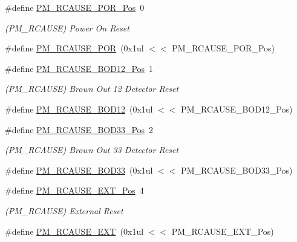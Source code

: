 \begin{DoxyCompactItemize}
\#define \mbox{\hyperlink{group___s_a_m_d21___p_m_ga34467ab2075605b8494c6540c5b5761a}{P\+M\+\_\+\+R\+C\+A\+U\+S\+E\+\_\+\+P\+O\+R\+\_\+\+Pos}}~0
\begin{DoxyCompactList}\small\item\em (P\+M\+\_\+\+R\+C\+A\+U\+SE) Power On Reset \end{DoxyCompactList}\item 
\#define \mbox{\hyperlink{group___s_a_m_d21___p_m_ga302ec011a5cc9a2bdfc793fe09ed5d17}{P\+M\+\_\+\+R\+C\+A\+U\+S\+E\+\_\+\+P\+OR}}~(0x1ul $<$$<$ P\+M\+\_\+\+R\+C\+A\+U\+S\+E\+\_\+\+P\+O\+R\+\_\+\+Pos)
\item 
\#define \mbox{\hyperlink{group___s_a_m_d21___p_m_ga22055fee692ccb23fee86eaa41bfc03a}{P\+M\+\_\+\+R\+C\+A\+U\+S\+E\+\_\+\+B\+O\+D12\+\_\+\+Pos}}~1
\begin{DoxyCompactList}\small\item\em (P\+M\+\_\+\+R\+C\+A\+U\+SE) Brown Out 12 Detector Reset \end{DoxyCompactList}\item 
\#define \mbox{\hyperlink{group___s_a_m_d21___p_m_ga80b791ec6e4eea8457acefdb2388bcd6}{P\+M\+\_\+\+R\+C\+A\+U\+S\+E\+\_\+\+B\+O\+D12}}~(0x1ul $<$$<$ P\+M\+\_\+\+R\+C\+A\+U\+S\+E\+\_\+\+B\+O\+D12\+\_\+\+Pos)
\item 
\#define \mbox{\hyperlink{group___s_a_m_d21___p_m_ga5e12f288c71a8c4f9a9308c6822f96a8}{P\+M\+\_\+\+R\+C\+A\+U\+S\+E\+\_\+\+B\+O\+D33\+\_\+\+Pos}}~2
\begin{DoxyCompactList}\small\item\em (P\+M\+\_\+\+R\+C\+A\+U\+SE) Brown Out 33 Detector Reset \end{DoxyCompactList}\item 
\#define \mbox{\hyperlink{group___s_a_m_d21___p_m_ga17b0eac2078f496f1cf9bf4de3045319}{P\+M\+\_\+\+R\+C\+A\+U\+S\+E\+\_\+\+B\+O\+D33}}~(0x1ul $<$$<$ P\+M\+\_\+\+R\+C\+A\+U\+S\+E\+\_\+\+B\+O\+D33\+\_\+\+Pos)
\item 
\#define \mbox{\hyperlink{group___s_a_m_d21___p_m_ga0c5c00a77162c22201c0957e72e274f4}{P\+M\+\_\+\+R\+C\+A\+U\+S\+E\+\_\+\+E\+X\+T\+\_\+\+Pos}}~4
\begin{DoxyCompactList}\small\item\em (P\+M\+\_\+\+R\+C\+A\+U\+SE) External Reset \end{DoxyCompactList}\item 
\#define \mbox{\hyperlink{group___s_a_m_d21___p_m_gab900ebc7012e2d2fe40ad6ff2aeeb079}{P\+M\+\_\+\+R\+C\+A\+U\+S\+E\+\_\+\+E\+XT}}~(0x1ul $<$$<$ P\+M\+\_\+\+R\+C\+A\+U\+S\+E\+\_\+\+E\+X\+T\+\_\+\+Pos)

\end{DoxyCompactItemize}
